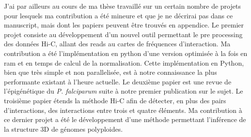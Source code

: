\begin{resumes}
J'ai par ailleurs au cours de ma thèse travaillé sur un certain nombre de
projets pour lesquels ma contribution a été mineure et que je ne décrirai pas
dans ce manuscript, mais dont les papiers peuvent être trouvés en appendice.
Le premier projet consiste au développement d'un nouvel outil permettant le
pre processing des données Hi-C, allant des reads au cartes de fréquences
d'interaction. Ma contribution a été l'implémentation en python d'une version
optimisée à la fois en ram et en temps de calcul de la normalisation. Cette
implémentation en Python, bien que très simple et non parallelisée, est à
notre connaissance la plus performante existant à l'heure actuelle. Le
deuxième papier est une revue de l'épigénétique du {\em P. falciparum} suite à
notre premier publication sur le sujet. Le troisième papier étends la méthode
Hi-C afin de détecter, en plus des pairs d'interactions, des interactions
entre trois et quatre éléments. Ma contribution à ce dernier projet a été le
développement d'une méthode permettant l'inférence de la structure 3D de
génomes polyploides.

\end{resumes}


